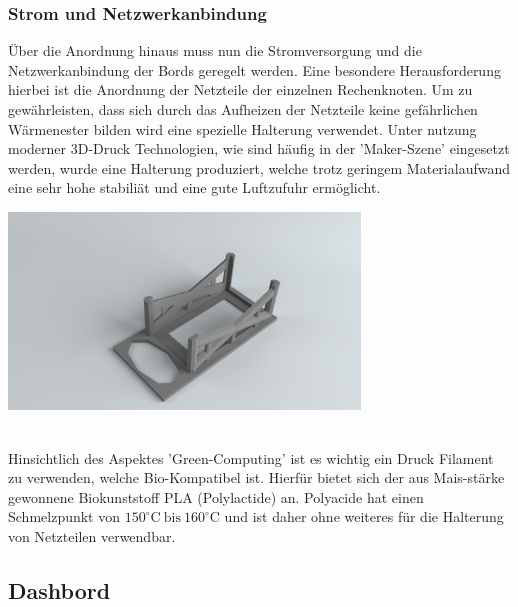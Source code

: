 \subsubsection{Strom und Netzwerkanbindung}
Über die Anordnung hinaus muss nun die Stromversorgung und die Netzwerkanbindung
der Bords geregelt werden. Eine besondere Herausforderung hierbei ist die 
Anordnung der Netzteile der einzelnen Rechenknoten. 
Um zu gewährleisten, dass sich durch das Aufheizen der Netzteile keine gefährlichen
Wärmenester bilden wird eine spezielle Halterung verwendet.
Unter nutzung moderner 3D-Druck Technologien, wie sind häufig in der 'Maker-Szene' eingesetzt werden,
wurde eine Halterung produziert, welche trotz geringem Materialaufwand eine sehr hohe stabiliät 
und eine gute Luftzufuhr ermöglicht.
\begin{minipage}{\textwidth}

\begin{center}
	\includegraphics[width=0.7\textwidth]{./Bilder/Server-Aufbau/RenderPowerSupplyBox30.png}
	\label{fig:sample_figure}

\end{center}	
\end{minipage}
~\\

Hinsichtlich des Aspektes 'Green-Computing' ist es wichtig ein Druck Filament zu verwenden, 
welche Bio-Kompatibel ist. Hierfür bietet sich der aus Mais-stärke gewonnene Biokunststoff PLA
(Polylactide) an. Polyacide hat einen Schmelzpunkt von $150^\circ\text{C}~\text{bis}~160^\circ \text{C}$
und ist daher ohne weiteres für die Halterung von Netzteilen verwendbar.


\subsection{Dashbord}
